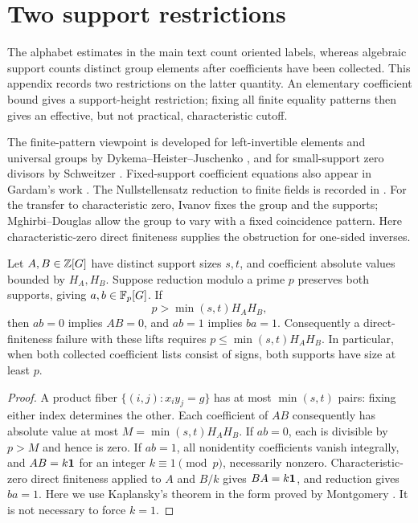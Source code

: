 \section{Two support restrictions}\label{app:supports}
The alphabet estimates in the main text count oriented labels, whereas algebraic support counts distinct group elements after coefficients have been collected. This appendix records two restrictions on the latter quantity. An elementary coefficient bound gives a support-height restriction; fixing all finite equality patterns then gives an effective, but not practical, characteristic cutoff.

The finite-pattern viewpoint is developed for left-invertible elements and universal groups by Dykema--Heister--Juschenko \cite[Section~4]{DHJ15}, and for small-support zero divisors by Schweitzer \cite[Section~2]{Sch13}. Fixed-support coefficient equations also appear in Gardam's work \cite[Sections~1 and~3]{Gar24}. The Nullstellensatz reduction to finite fields is recorded in \cite[Section~1]{BFF24}. For the transfer to characteristic zero, Ivanov \cite[Section~8.3]{Iva26} fixes the group and the supports; Mghirbi--Douglas \cite[Proposition~8.3]{MD26} allow the group to vary with a fixed coincidence pattern. Here characteristic-zero direct finiteness supplies the obstruction for one-sided inverses.

\begin{proposition}\label{prop:height}
Let $A,B\in\mathbb Z[G]$ have distinct support sizes $s,t$, and coefficient absolute values bounded by $H_A,H_B$. Suppose reduction modulo a prime $p$ preserves both supports, giving $a,b\in\mathbb F_p[G]$. If
\[
 p>\min(s,t)H_AH_B,
\]
then $ab=0$ implies $AB=0$, and $ab=1$ implies $ba=1$. Consequently a direct-finiteness failure with these lifts requires $p\le\min(s,t)H_AH_B$. In particular, when both collected coefficient lists consist of signs, both supports have size at least $p$.
\end{proposition}
\begin{proof}
A product fiber $\{(i,j):x_iy_j=g\}$ has at most $\min(s,t)$ pairs: fixing either index determines the other. Each coefficient of $AB$ consequently has absolute value at most $M=\min(s,t)H_AH_B$. If $ab=0$, each is divisible by $p>M$ and hence is zero. If $ab=1$, all nonidentity coefficients vanish integrally, and $AB=k\mathbf1$ for an integer $k\equiv1\pmod p$, necessarily nonzero. Characteristic-zero direct finiteness applied to $A$ and $B/k$ gives $BA=k\mathbf1$, and reduction gives $ba=1$. Here we use Kaplansky's theorem in the form proved by Montgomery \cite{Mon69}. It is not necessary to force $k=1$.
\end{proof}

